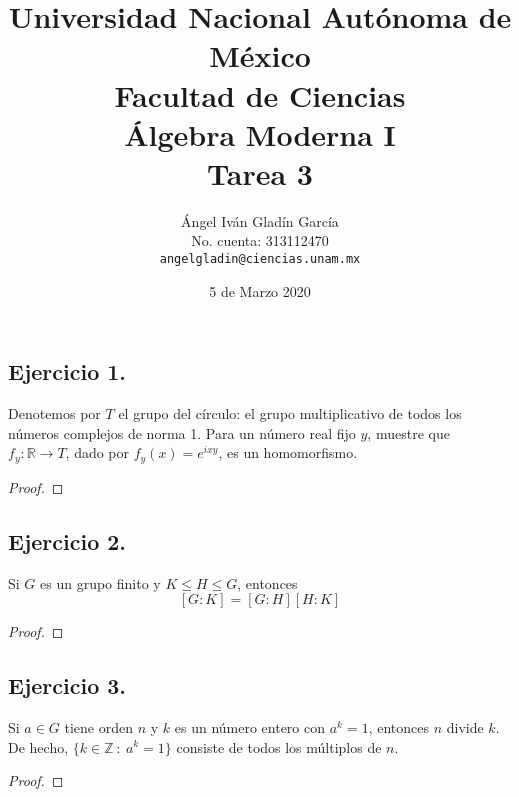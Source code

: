 \documentclass[11pt,letterpaper]{article}
\newcommand{\Z}{\mathbb{Z}}
\newcommand{\R}{\mathbb{R}}
\begin{document}
\title{
        Universidad Nacional Autónoma de México\\
        Facultad de Ciencias\\
        Álgebra Moderna I\\
    \vspace{.5cm}
    \large
        \textbf{Tarea 3}
}
\author{
    Ángel Iván Gladín García\\
    No. cuenta: 313112470\\
    \texttt{angelgladin@ciencias.unam.mx}
}
\date{5 de Marzo 2020}
\maketitle

\newtheorem{theorem}{Teorema}
\newtheorem{example}{Ejemplo}
\newtheorem{corollary}{Corolario}
\newtheorem{lemma}{Lemma}
\newtheorem{definition}{Definicion}
\newtheorem{prop}{Proposicion}

\subsection*{Ejercicio 1.}
Denotemos por $T$ el grupo del círculo: el grupo multiplicativo de todos los números complejos de
norma 1. Para un número real fijo $y$, muestre que $f_y : \R \to T$, dado por $f_y(x) = e^{ixy}$,
es un homomorfismo.
\begin{proof}
    
\end{proof}

\subsection*{Ejercicio 2.}
Si $G$ es un grupo finito y $K \leq H \leq G$, entonces
\[ [G:K] = [G:H][H:K] \]
\begin{proof}
    
\end{proof}

\subsection*{Ejercicio 3.}
Si $a \in G$ tiene orden $n$ y $k$ es un número entero con $a^k=1$, entonces $n$ divide $k$.
De hecho, $\{ k \in \Z \ : \ a^k=1 \}$ consiste de todos los múltiplos de $n$.
\begin{proof}
    
\end{proof}
\end{document}

